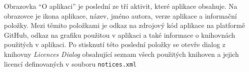 \documentclass[../TakeYourPill.tex]{subfiles}
\begin{document}
Obrazovka \enquote{O aplikaci} je poslední ze tří aktivit, které aplikace obsahuje. Na obrazovce je ikona aplikace, název, jméno autora, verze aplikace a informační položky. Mezi těmito položkami je odkaz na zdrojový kód aplikace na platformě GitHub, odkaz na grafiku použitou v aplikaci a také informace o knihovnách použitých v aplikaci. Po stisknutí této poslední položky se otevře dialog z knihovny \textit{Licences Dialog} \cite{licences} obsahující seznam všech použitých knihoven a jejich licencí definovaných v souboru \texttt{notices.xml}
\end{document}
